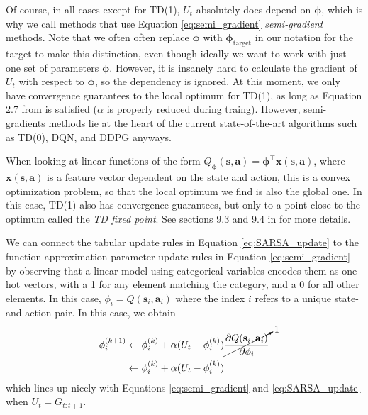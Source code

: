 \documentclass{article}
\begin{document}
Of course, in all cases except for TD(1), $U_t$ absolutely does depend on $\boldsymbol{\phi}$, which is why we call methods that use Equation \ref{eq:semi_gradient} \textit{semi-gradient} methods. Note that we often often replace $\boldsymbol{\phi}$ with $\boldsymbol{\phi}_\text{target}$ in our notation for the target to make this distinction, even though ideally we want to work with just one set of parameters  $\boldsymbol{\phi}$. However, it is insanely hard to calculate the gradient of $U_t$ with respect to $\boldsymbol{\phi}$, so the dependency is ignored. At this moment, we only have convergence guarantees to the local optimum for TD(1), as long as Equation 2.7 from \cite{sutton_barto_rl} is satisfied ($\alpha$ is properly reduced during traing). However, semi-gradients methods lie at the heart of the current state-of-the-art algorithms such as TD(0), DQN\cite{bootstrap_DQN}, and DDPG\cite{ddpg} anyways. 

When looking at linear functions of the form $Q_{\boldsymbol{\phi}}(\mathbf{s},\mathbf{a})=\boldsymbol{\phi}^\top\mathbf{x}(\mathbf{s},\mathbf{a})$, where $\mathbf{x}(\mathbf{s},\mathbf{a})$ is a feature vector dependent on the state and action, this is a convex optimization problem, so that the local optimum we find is also the global one. In this case, TD(1) also has convergence guarantees, but only to a point close to the optimum called the \textit{TD fixed point}. See sections 9.3 and 9.4 in \cite{sutton_barto_rl} for more details.

We can connect the tabular update rules in Equation \ref{eq:SARSA_update} to the function approximation parameter update rules in Equation \ref{eq:semi_gradient} by observing that a linear model using categorical variables encodes them as one-hot vectors, with a 1 for any element matching the category, and a 0 for all other elements. In this case, $\phi_i=Q(\mathbf{s}_i,\mathbf{a}_i)$ where the index $i$ refers to a unique state-and-action pair. In this case, we obtain 
\begin{equation}
\begin{split}
\phi_i^{(k+1)}&\leftarrow\phi_i^{(k)}+\alpha(U_t-\phi_i^{(k)})\cancelto{1}{\frac{\partial Q(\mathbf{s}_i,\mathbf{a}_i)}{\partial \phi_i}}\\&\leftarrow\phi_i^{(k)}+\alpha(U_t-\phi_i^{(k)})\end{split}\end{equation}which lines up nicely with Equations \ref{eq:semi_gradient} and \ref{eq:SARSA_update} when $U_t=G_{t:t+1}$. 
\end{document}
